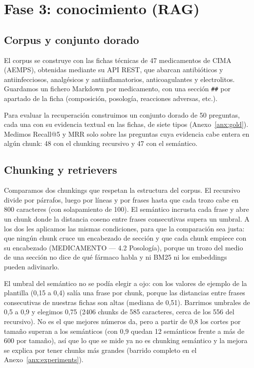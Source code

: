 \section{Fase 3: conocimiento (RAG)}
\label{sec:fase3}
\subsection{Corpus y conjunto dorado}
El corpus se construye con las fichas técnicas de 47 medicamentos de CIMA (AEMPS), obtenidas mediante su API REST, que abarcan antibióticos y antiinfecciosos, analgésicos y antiinflamatorios, anticoagulantes y electrolitos. Guardamos un fichero Markdown por medicamento, con una sección \texttt{\#\#} por apartado de la ficha (composición, posología, reacciones adversas, etc.).

Para evaluar la recuperación construimos un conjunto dorado de 50 preguntas, cada una con su evidencia textual en las fichas, de siete tipos (Anexo~\ref{anx:gold}). Medimos Recall@5 y MRR solo sobre las preguntas cuya evidencia cabe entera en algún chunk: 48 con el chunking recursivo y 47 con el semántico.

\subsection{Chunking y retrievers}
Comparamos dos chunkings que respetan la estructura del corpus. El recursivo divide por párrafos, luego por líneas y por frases hasta que cada trozo cabe en 800 caracteres (con solapamiento de 100). El semántico incrusta cada frase y abre un chunk donde la distancia coseno entre frases consecutivas supera un umbral. A los dos les aplicamos las mismas condiciones, para que la comparación sea justa: que ningún chunk cruce un encabezado de sección y que cada chunk empiece con su encabezado (MEDICAMENTO — 4.2 Posología), porque un trozo del medio de una sección no dice de qué fármaco habla y ni BM25 ni los embeddings pueden adivinarlo.

El umbral del semántico no se podía elegir a ojo: con los valores de ejemplo de la plantilla (0,15 a 0,4) salía una frase por chunk, porque las distancias entre frases consecutivas de nuestras fichas son altas (mediana de 0,51). Barrimos umbrales de 0,5 a 0,9 y elegimos 0,75 (2406 chunks de 585 caracteres, cerca de los 556 del recursivo). No es el que mejores números da, pero a partir de 0,8 los cortes por tamaño superan a los semánticos (con 0,9 quedan 12 semánticos frente a más de 600 por tamaño), así que lo que se mide ya no es chunking semántico y la mejora se explica por tener chunks más grandes (barrido completo en el Anexo~\ref{anx:experiments}).

